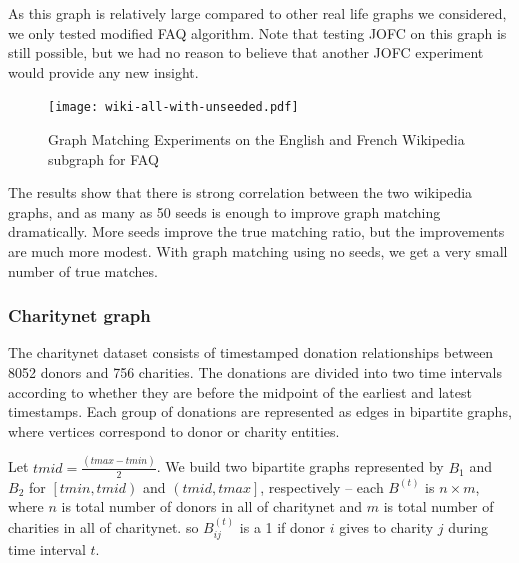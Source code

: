 \documentclass[12pt,oneside,final]{thesis}
\begin{document}
 As this graph is relatively large compared to other real life graphs we considered, we only tested modified FAQ algorithm. Note that testing JOFC on this graph is still possible, but we had no reason to believe that another JOFC experiment would provide any new insight.

\begin{figure}
\texttt{[image: wiki-all-with-unseeded.pdf]}
\caption{Graph Matching Experiments on the English and French Wikipedia subgraph for FAQ \label{wiki_graphmatch}}
\end{figure}
      
The results show that there is strong correlation between the two wikipedia graphs, and as many as 50 seeds is enough to improve graph matching dramatically. More seeds improve the true matching ratio,  but the improvements are much more modest. With graph matching using no seeds, we get a very small number of  true matches. 
      
\subsubsection{Charitynet graph}

The charitynet dataset consists  of timestamped donation relationships between 8052 donors and 756 charities. The donations are divided into two time intervals according to whether they are before the midpoint of the earliest and latest timestamps. Each group of donations are represented as edges in bipartite graphs, where vertices correspond to donor or charity entities.

Let $tmid = \frac{(tmax - tmin)}{2}$.
We build two bipartite graphs represented by $B_1$ and $B_2$ for $\left[tmin,tmid\right)$ and $\left(tmid,tmax\right]$, respectively --
each $B^{(t)}$ is $n \times m$, where $n$ is total number of donors in all of charitynet and $m$ is total number of charities in all of charitynet.
so $B_{ij}^{(t)}$ is a 1 if donor $i$ gives to charity $j$ during time interval $t$.
\end{document}
